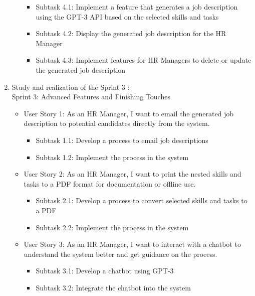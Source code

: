 \begin{enumerate}
\begin{itemize}
        \begin{itemize}
            \item Subtask 4.1: Implement a feature that generates a job description using the GPT-3 API based on the selected skills and tasks
            \item Subtask 4.2: Display the generated job description for the HR Manager
            \item Subtask 4.3: Implement features for HR Managers to delete or update the generated job description
        \end{itemize}   
    \end{itemize}    

    \item Study and realization of the Sprint 3 : \\
    Sprint 3: Advanced Features and Finishing Touches
    \begin{itemize}
        \renewcommand\labelitemi{-}
        \item User Story 1: As an HR Manager, I want to email the generated job description to potential candidates directly from the system.\\
        \begin{itemize}
            \item Subtask 1.1: Develop a process to email job descriptions
            \item Subtask 1.2: Implement the process in the system
        \end{itemize}    
        \item User Story 2: As an HR Manager, I want to print the nested skills and tasks to a PDF format for documentation or offline use. \\
        \begin{itemize}
            \item Subtask 2.1: Develop a process to convert selected skills and tasks to a PDF
            \item Subtask 2.2: Implement the process in the system
        \end{itemize}   
        \item User Story 3: As an HR Manager, I want to interact with a chatbot to understand the system better and get guidance on the process. \\
        \begin{itemize}
            \item Subtask 3.1: Develop a chatbot using GPT-3
            \item Subtask 3.2: Integrate the chatbot into the system
        \end{itemize}   
    \end{itemize}  
\end{enumerate}    


